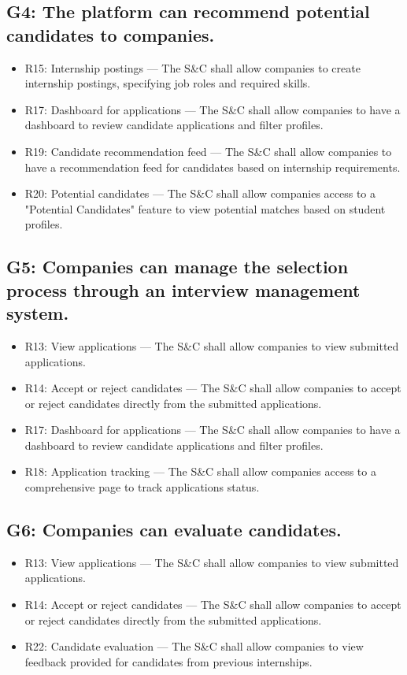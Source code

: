 \subsection{G4: The platform can recommend potential candidates to companies.}
\begin{itemize}
    \item R15: Internship postings — The S\&C shall allow companies to create internship postings, specifying job roles and required skills.
    \item R17: Dashboard for applications — The S\&C shall allow companies to have a dashboard to review candidate applications and filter profiles.
    \item R19: Candidate recommendation feed — The S\&C shall allow companies to have a recommendation feed for candidates based on internship requirements.
    \item R20: Potential candidates — The S\&C shall allow companies access to a "Potential Candidates" feature to view potential matches based on student profiles.
\end{itemize}

\subsection{G5: Companies can manage the selection process through an interview management system.}
\begin{itemize}
    \item R13: View applications — The S\&C shall allow companies to view submitted applications.
    \item R14: Accept or reject candidates — The S\&C shall allow companies to accept or reject candidates directly from the submitted applications.
    \item R17: Dashboard for applications — The S\&C shall allow companies to have a dashboard to review candidate applications and filter profiles.
    \item R18: Application tracking — The S\&C shall allow companies access to a comprehensive page to track applications status.
\end{itemize}

\subsection{G6: Companies can evaluate candidates.}
\begin{itemize}
    \item R13: View applications — The S\&C shall allow companies to view submitted applications.
    \item R14: Accept or reject candidates — The S\&C shall allow companies to accept or reject candidates directly from the submitted applications.
    \item R22: Candidate evaluation — The S\&C shall allow companies to view feedback provided for candidates from previous internships.
\end{itemize}

